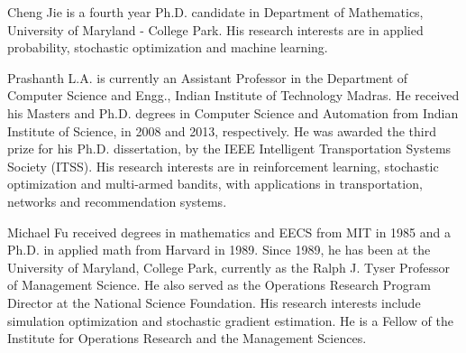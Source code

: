 \documentclass[twocolumn]{IEEEtran}
\begin{document}



\vspace{-1ex}


\begin{IEEEbiographynophoto}{Cheng Jie}
is a fourth year Ph.D. candidate in Department of Mathematics, University of Maryland - College Park. His research interests are in applied probability, stochastic optimization and machine learning. 
\end{IEEEbiographynophoto}

\vspace{-3ex}

\begin{IEEEbiographynophoto}{Prashanth L.A.}
is currently an Assistant Professor in the Department of Computer Science and Engg., Indian Institute of Technology Madras.
He received his Masters and Ph.D. degrees in Computer Science and Automation from Indian Institute of Science, in 2008 and 2013, respectively.  He was awarded the third prize for his Ph.D. dissertation, by the IEEE Intelligent Transportation Systems Society (ITSS).
His research interests are in reinforcement learning, stochastic optimization and multi-armed bandits, with applications in transportation, networks and recommendation systems.
\end{IEEEbiographynophoto}

\vspace{-3ex}

\begin{IEEEbiographynophoto}{Michael Fu}
received degrees in mathematics and EECS from MIT in 1985 and a Ph.D. in applied math from Harvard in 1989. Since 1989, he has been at the University of Maryland, College Park, currently as the Ralph J. Tyser Professor of Management Science.  He also served as the Operations Research Program Director at the National Science Foundation. His research interests include simulation optimization and stochastic gradient estimation. He is a Fellow of the Institute for Operations Research and the Management Sciences.
\end{IEEEbiographynophoto}
\end{document}
